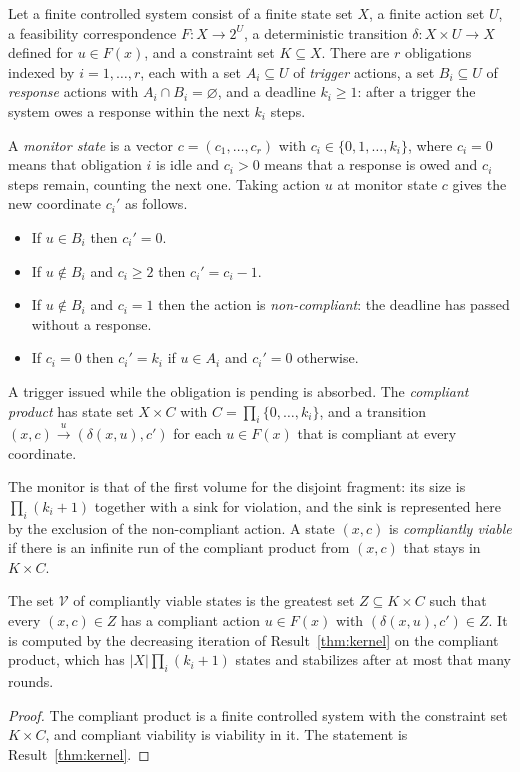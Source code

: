 \begin{definition}\label{def:vobl}
Let a finite controlled system consist of a finite state set $X$, a finite action set $U$, a feasibility correspondence $F:X\to2^{U}$, a deterministic transition $\delta:X\times U\to X$ defined for $u\in F(x)$, and a constraint set $K\subseteq X$. There are $r$ obligations indexed by $i=1,\dots,r$, each with a set $A_i\subseteq U$ of \emph{trigger} actions, a set $B_i\subseteq U$ of \emph{response} actions with $A_i\cap B_i=\varnothing$, and a deadline $k_i\ge1$: after a trigger the system owes a response within the next $k_i$ steps.

A \emph{monitor state} is a vector $c=(c_1,\dots,c_r)$ with $c_i\in\{0,1,\dots,k_i\}$, where $c_i=0$ means that obligation $i$ is idle and $c_i>0$ means that a response is owed and $c_i$ steps remain, counting the next one. Taking action $u$ at monitor state $c$ gives the new coordinate $c_i'$ as follows.
\begin{itemize}[nosep]
  \item If $u\in B_i$ then $c_i'=0$.
  \item If $u\notin B_i$ and $c_i\ge2$ then $c_i'=c_i-1$.
  \item If $u\notin B_i$ and $c_i=1$ then the action is \emph{non-compliant}: the deadline has passed without a response.
  \item If $c_i=0$ then $c_i'=k_i$ if $u\in A_i$ and $c_i'=0$ otherwise.
\end{itemize}
A trigger issued while the obligation is pending is absorbed. The \emph{compliant product} has state set $X\times C$ with $C=\prod_i\{0,\dots,k_i\}$, and a transition $(x,c)\xrightarrow{u}(\delta(x,u),c')$ for each $u\in F(x)$ that is compliant at every coordinate.
\end{definition}

The monitor is that of the first volume for the disjoint fragment: its size is $\prod_i(k_i+1)$ together with a sink for violation, and the sink is represented here by the exclusion of the non-compliant action. A state $(x,c)$ is \emph{compliantly viable} if there is an infinite run of the compliant product from $(x,c)$ that stays in $K\times C$.

\begin{newresult}\label{thm:obl-kernel}
The set $\mathcal V$ of compliantly viable states is the greatest set $Z\subseteq K\times C$ such that every $(x,c)\in Z$ has a compliant action $u\in F(x)$ with $(\delta(x,u),c')\in Z$. It is computed by the decreasing iteration of Result~\ref{thm:kernel} on the compliant product, which has $|X|\prod_i(k_i+1)$ states and stabilizes after at most that many rounds.
\end{newresult}
\begin{proof}
The compliant product is a finite controlled system with the constraint set $K\times C$, and compliant viability is viability in it. The statement is Result~\ref{thm:kernel}.
\end{proof}

